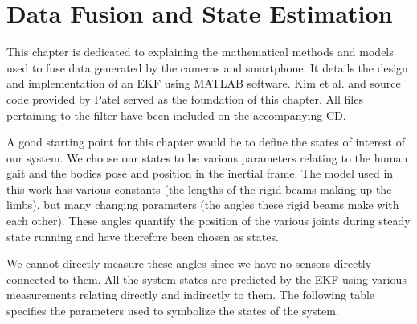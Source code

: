\chapter{Data Fusion and State Estimation}
This chapter is dedicated to explaining the mathematical methods and models used to fuse data generated by the cameras and smartphone. It details the design and implementation of an EKF using MATLAB software. Kim et al. \cite{kim2011kalman} and source code provided by Patel served as the foundation of this chapter. All files pertaining to the filter have been included on the accompanying CD.

A good starting point for this chapter would be to define the states of interest of our system. We choose our states to be various parameters relating to the human gait and the bodies pose and position in the inertial frame. The model used in this work has various constants (the lengths of the rigid beams making up the limbs), but many changing parameters (the angles these rigid beams make with each other). These angles quantify the position of the various joints during steady state running and have therefore been chosen as states.

We cannot directly measure these angles since we have no sensors directly connected to them. All the system states are predicted by the EKF using various measurements relating directly and indirectly to them. The following table specifies the parameters used to symbolize the states of the system.
   
